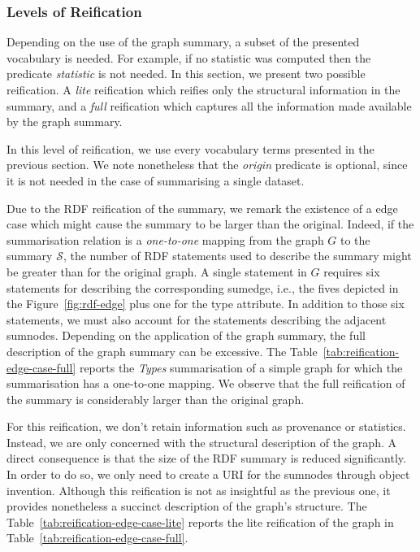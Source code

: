 \subsubsection{Levels of Reification}

Depending on the use of the graph summary, a subset of the presented vocabulary is needed. For example, if no statistic was computed then the predicate \emph{statistic} is not needed. In this section, we present two possible reification. A \emph{lite} reification which reifies only the structural information in the summary, and a \emph{full} reification which captures all the information made available by the graph summary.


In this level of reification, we use every vocabulary terms presented in the previous section. We note nonetheless that the \emph{origin} predicate is optional, since it is not needed in the case of summarising a single dataset.

Due to the RDF reification of the summary, we remark the existence of a edge case which might cause the summary to be larger than the original. Indeed, if the summarisation relation is a \emph{one-to-one} mapping from the graph $G$ to the summary $\mathcal{S}$, the number of RDF statements used to describe the summary might be greater than for the original graph. A single statement in $G$ requires six statements for describing the corresponding sumedge, i.e., the fives depicted in the Figure~\ref{fig:rdf-edge} plus one for the type attribute. In addition to those six statements, we must also account for the statements describing the adjacent sumnodes. Depending on the application of the graph summary, the full description of the graph summary can be excessive. The Table~\ref{tab:reification-edge-case-full} reports the \emph{Types} summarisation of a simple graph for which the summarisation has a one-to-one mapping. We observe that the full reification of the summary is considerably larger than the original graph.


For this reification, we don't retain information such as provenance or statistics. Instead, we are only concerned with the structural description of the graph. A direct consequence is that the size of the RDF summary is reduced significantly. In order to do so, we only need to create a URI for the sumnodes through object invention. Although this reification is not as insightful as the previous one, it provides nonetheless a succinct description of the graph's structure. The Table~\ref{tab:reification-edge-case-lite} reports the lite reification of the graph in Table~\ref{tab:reification-edge-case-full}.

